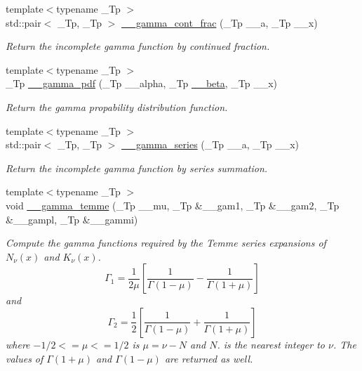 \begin{DoxyCompactItemize}
{\footnotesize template$<$typename \+\_\+\+Tp $>$ }\\std\+::pair$<$ \+\_\+\+Tp, \+\_\+\+Tp $>$ \hyperlink{namespacestd_1_1____detail_afd6319747af991947a02388acee40c26}{\+\_\+\+\_\+gamma\+\_\+cont\+\_\+frac} (\+\_\+\+Tp \+\_\+\+\_\+a, \+\_\+\+Tp \+\_\+\+\_\+x)
\begin{DoxyCompactList}\small\item\em Return the incomplete gamma function by continued fraction. \end{DoxyCompactList}\item 
{\footnotesize template$<$typename \+\_\+\+Tp $>$ }\\\+\_\+\+Tp \hyperlink{namespacestd_1_1____detail_a13146321e4e094815de990c33b83b02a}{\+\_\+\+\_\+gamma\+\_\+pdf} (\+\_\+\+Tp \+\_\+\+\_\+alpha, \+\_\+\+Tp \hyperlink{namespacestd_1_1____detail_a090d2f0920e0d208c467609b2a81d717}{\+\_\+\+\_\+beta}, \+\_\+\+Tp \+\_\+\+\_\+x)
\begin{DoxyCompactList}\small\item\em Return the gamma propability distribution function. \end{DoxyCompactList}\item 
{\footnotesize template$<$typename \+\_\+\+Tp $>$ }\\std\+::pair$<$ \+\_\+\+Tp, \+\_\+\+Tp $>$ \hyperlink{namespacestd_1_1____detail_aa480c595e1c5b894d76398cf0e8eb02b}{\+\_\+\+\_\+gamma\+\_\+series} (\+\_\+\+Tp \+\_\+\+\_\+a, \+\_\+\+Tp \+\_\+\+\_\+x)
\begin{DoxyCompactList}\small\item\em Return the incomplete gamma function by series summation. \end{DoxyCompactList}\item 
{\footnotesize template$<$typename \+\_\+\+Tp $>$ }\\void \hyperlink{namespacestd_1_1____detail_a101d608648b7ecb3d1c7a8500f902e6c}{\+\_\+\+\_\+gamma\+\_\+temme} (\+\_\+\+Tp \+\_\+\+\_\+mu, \+\_\+\+Tp \&\+\_\+\+\_\+gam1, \+\_\+\+Tp \&\+\_\+\+\_\+gam2, \+\_\+\+Tp \&\+\_\+\+\_\+gampl, \+\_\+\+Tp \&\+\_\+\+\_\+gammi)
\begin{DoxyCompactList}\small\item\em Compute the gamma functions required by the Temme series expansions of $ N_\nu(x) $ and $ K_\nu(x) $. \[ \Gamma_1 = \frac{1}{2\mu} [\frac{1}{\Gamma(1 - \mu)} - \frac{1}{\Gamma(1 + \mu)}] \] and \[ \Gamma_2 = \frac{1}{2} [\frac{1}{\Gamma(1 - \mu)} + \frac{1}{\Gamma(1 + \mu)}] \] where $ -1/2 <= \mu <= 1/2 $ is $ \mu = \nu - N $ and $ N $. is the nearest integer to $ \nu $. The values of $ \Gamma(1 + \mu) $ and $ \Gamma(1 - \mu) $ are returned as well. \end{DoxyCompactList}\item 

\end{DoxyCompactItemize}
